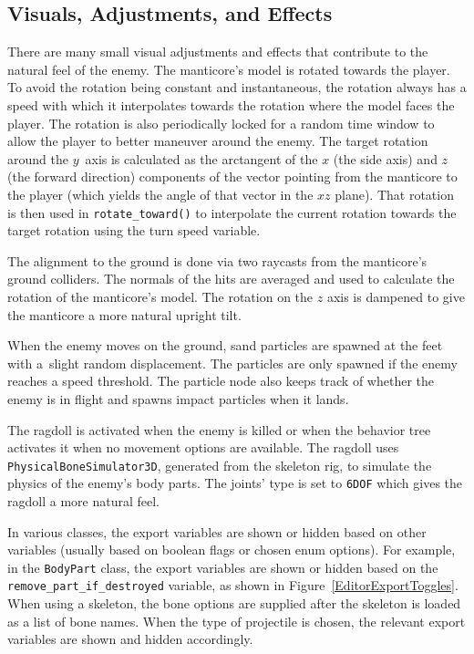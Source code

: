 \subsection{Visuals, Adjustments, and Effects}
\label{VisualsAdjustmentsEffects}
There are many small visual adjustments and effects that contribute to the natural feel of the enemy.
The manticore's model is rotated towards the player. To avoid the rotation being constant and instantaneous, the rotation always has a speed with which it interpolates towards the rotation where the model faces the player. The rotation is also periodically locked for a random time window to allow the player to better maneuver around the enemy. The target rotation around the $y$~axis is calculated as the arctangent of the $x$ (the side axis) and $z$ (the forward direction) components of the vector pointing from the manticore to the player (which yields the angle of that vector in the $xz$ plane). That rotation is then used in \texttt{rotate\_toward()} to interpolate the current rotation towards the target rotation using the turn speed variable.

The alignment to the ground is done via two raycasts from the manticore's ground colliders. The normals of the hits are averaged and used to calculate the rotation of the manticore's model. The rotation on the $z$ axis is dampened to give the manticore a more natural upright tilt.

When the enemy moves on the ground, sand particles are spawned at the feet with a~slight random displacement. The particles are only spawned if the enemy reaches a speed threshold. The particle node also keeps track of whether the enemy is in flight and spawns impact particles when it lands.

The ragdoll is activated when the enemy is killed or when the behavior tree activates it when no movement options are available. The ragdoll uses \texttt{PhysicalBoneSimulator3D}, generated from the skeleton rig, to simulate the physics of the enemy's body parts. The joints' type is set to \texttt{6DOF} which gives the ragdoll a more natural feel.

In various classes, the export variables are shown or hidden based on other variables (usually based on boolean flags or chosen enum options). For example, in the \texttt{BodyPart} class, the export variables are shown or hidden based on the \texttt{remove\_part\_if\_destroyed} variable, as shown in Figure~\ref{EditorExportToggles}. When using a skeleton, the bone options are supplied after the skeleton is loaded as a list of bone names. When the type of projectile is chosen, the relevant export variables are shown and hidden accordingly.

